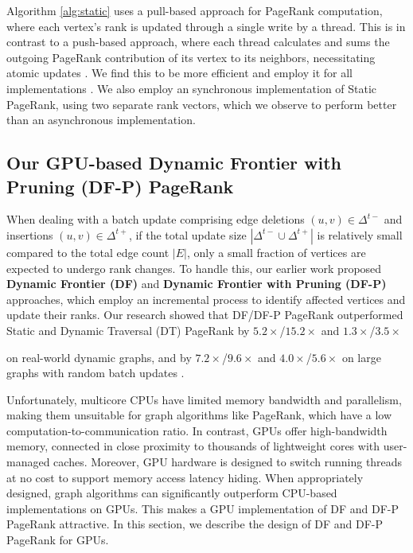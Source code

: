 Algorithm \ref{alg:static} uses a pull-based approach for PageRank computation, where each vertex's rank is updated through a single write by a thread. This is in contrast to a push-based approach, where each thread calculates and sums the outgoing PageRank contribution of its vertex to its neighbors, necessitating atomic updates \cite{verstraaten2015quantifying}. We find this to be more efficient and employ it for all implementations \cite{sahu2024df}. We also employ an synchronous implementation of Static PageRank, using two separate rank vectors, which we observe to perform better than an asynchronous implementation.




\subsection{Our GPU-based Dynamic Frontier with Pruning (DF-P) PageRank}
\label{sec:frontier}

When dealing with a batch update comprising edge deletions $(u, v) \in \Delta^{t-}$ and insertions $(u, v) \in \Delta^{t+}$, if the total update size $|\Delta^{t-} \cup \Delta^{t+}|$ is relatively small compared to the total edge count $|E|$, only a small fraction of vertices are expected to undergo rank changes. To handle this, our earlier work proposed \textbf{Dynamic Frontier (DF)} and \textbf{Dynamic Frontier with Pruning (DF-P)} approaches, which employ an incremental process to identify affected vertices and update their ranks. Our research showed that DF/DF-P PageRank outperformed Static and Dynamic Traversal (DT) PageRank by $5.2\times$/$15.2\times$ and $1.3\times$/$3.5\times$ on real-world dynamic graphs, and by $7.2\times$/$9.6\times$ and $4.0\times$/$5.6\times$ on large graphs with random batch updates \cite{sahu2024df}.

Unfortunately, multicore CPUs have limited memory bandwidth and parallelism, making them unsuitable for graph algorithms like PageRank, which have a low computation-to-communication ratio. In contrast, GPUs offer high-bandwidth memory, connected in close proximity to thousands of lightweight cores with user-managed caches. Moreover, GPU hardware is designed to switch running threads at no cost to support memory access latency hiding. When appropriately designed, graph algorithms can significantly outperform CPU-based implementations on GPUs. This makes a GPU implementation of DF and DF-P PageRank attractive. In this section, we describe the design of DF and DF-P PageRank for GPUs.

